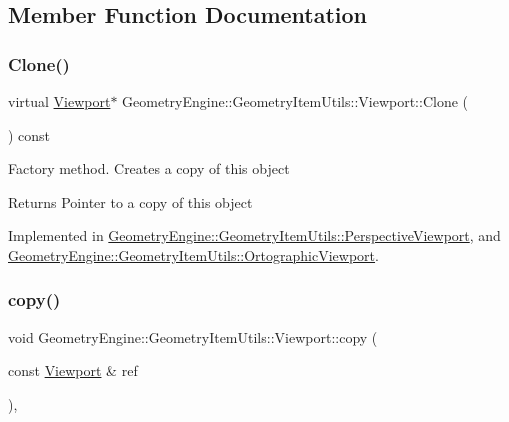 \subsection{Member Function Documentation}
\mbox{\label{class_geometry_engine_1_1_geometry_item_utils_1_1_viewport_a8bd47866a001eae03f88df67fd699904}} 
\subsubsection{\texorpdfstring{Clone()}{Clone()}}
{\footnotesize\ttfamily virtual \mbox{\hyperlink{class_geometry_engine_1_1_geometry_item_utils_1_1_viewport}{Viewport}}$\ast$ Geometry\+Engine\+::\+Geometry\+Item\+Utils\+::\+Viewport\+::\+Clone (\begin{DoxyParamCaption}{ }\end{DoxyParamCaption}) const\hspace{0.3cm}{\ttfamily [pure virtual]}}

Factory method. Creates a copy of this object \begin{DoxyReturn}{Returns}
Pointer to a copy of this object 
\end{DoxyReturn}


Implemented in \mbox{\hyperlink{class_geometry_engine_1_1_geometry_item_utils_1_1_perspective_viewport_a828a22e5d39e7c8d1812e97f582bf667}{Geometry\+Engine\+::\+Geometry\+Item\+Utils\+::\+Perspective\+Viewport}}, and \mbox{\hyperlink{class_geometry_engine_1_1_geometry_item_utils_1_1_ortographic_viewport_a7729f7619d67c139f8510c305de1a286}{Geometry\+Engine\+::\+Geometry\+Item\+Utils\+::\+Ortographic\+Viewport}}.

\mbox{\label{class_geometry_engine_1_1_geometry_item_utils_1_1_viewport_a2cd0eeeac769d5da977a17a4e394a1d9}} 
\subsubsection{\texorpdfstring{copy()}{copy()}}
{\footnotesize\ttfamily void Geometry\+Engine\+::\+Geometry\+Item\+Utils\+::\+Viewport\+::copy (\begin{DoxyParamCaption}\item[{const \mbox{\hyperlink{class_geometry_engine_1_1_geometry_item_utils_1_1_viewport}{Viewport}} \&}]{ref }\end{DoxyParamCaption})\hspace{0.3cm}{\ttfamily [protected]}, {\ttfamily [virtual]}}

